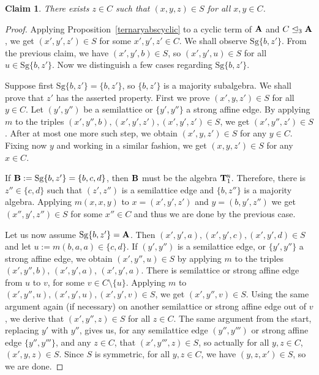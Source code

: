 \documentclass[11pt]{amsart}
\newcommand{\m}[1]{\mathbf{\uppercase{#1}}}
\newcommand{\n}{\scriptscriptstyle{\mathsf{N}}}
\theoremstyle{definition}
\theoremstyle{remark}
\theoremstyle{plain}
\newtheorem{claim}[thm]{Claim}
\begin{document}
\begin{claim}
There exists $z\in C$ such that $(x,y,z)\in S$ for all $x,y\in C$.
\end{claim}
\begin{proof}
Applying Proposition~\ref{ternaryabscyclic} to a cyclic term of $\m a$ and $C\trianglelefteq_3 \m A$, we get $(x',y',z')\in S$ for some $x',y',z'\in C$. We shall observe $\mathrm{Sg}\{b,z'\}$. From the previous claim, we have $(x',y',b)\in S$, so $(x',y',u)\in S$ for all $u\in\mathrm{Sg}\{b,z'\}$. Now we distinguish a few cases regarding $\mathrm{Sg}\{b,z'\}$.

  Suppose first $\mathrm{Sg}\{b,z'\}=\{b,z'\}$, so $\{b,z'\}$ is a majority subalgebra. We shall prove that $z'$ has the asserted property. First we prove $(x',y,z')\in S$ for all $y\in C$. Let $(y',y'')$ be a semilattice or $\{y',y''\}$ a strong affine edge. By applying $m$ to the triples $(x',y'',b),(x',y',z'),(x',y',z')\in S$, we get $(x',y'',z')\in S$. After at most one more such step, we obtain $(x',y,z')\in S$ for any $y\in C$. Fixing now $y$ and working in a similar fashion, we get $(x,y,z')\in S$ for any $x\in C$.

  If $\m b:=\mathrm{Sg}\{b,z'\}=\{b,c,d\}$, then $\m b$ must be the algebra $\m t_1^{\n}$. Therefore, there is $z''\in\{c,d\}$ such that $(z',z'')$ is a semilattice edge and $\{b,z''\}$ is a majority algebra. Applying $m(x,x,y)$ to $x=(x',y',z')$ and $y=(b,y',z'')$ we get $(x'',y',z'')\in S$ for some $x''\in C$ and thus we are done by the previous case.

  Let us now assume $\mathrm{Sg}\{b,z'\}=\m a$. Then $(x',y',a),(x',y',c),(x',y',d)\in S$ and let $u:=m(b,a,a)\in \{c,d\}$. If $(y',y'')$ is a semilattice edge, or $\{y',y''\}$ a strong affine edge, we obtain $(x',y'',u)\in S$ by applying $m$ to the triples $(x',y'',b)$, $(x',y',a)$, $(x',y',a)$. There is semilattice or strong affine edge from $u$ to $v$, for some $v\in C\setminus \{u\}$. Applying $m$ to $(x',y'',u),(x',y',u),(x',y',v)\in S$, we get $(x',y'',v)\in S$. Using the same argument again (if necessary) on another semilattice or strong affine edge out of $v$, we derive that $(x',y'',z)\in S$ for all $z\in C$. The same argument from the start, replacing $y'$ with $y''$, gives us, for any semilattice edge $(y'',y''')$ or strong affine edge $\{y'',y'''\}$, and any $z\in C$, that $(x',y''',z)\in S$, so actually for all $y,z\in C$, $(x',y,z)\in S$. Since $S$ is symmetric, for all $y,z\in C$, we have $(y,z,x')\in S$, so we are done.\end{proof}
\end{document}
